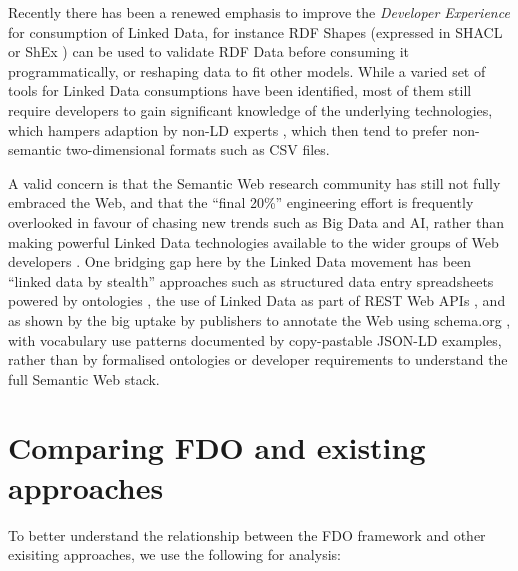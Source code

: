 \documentclass[fleqn,10pt,lineno]{wlpeerj}
\begin{document}
Recently there has been a renewed emphasis to improve the \emph{Developer Experience} \cite{BFMoe8FC} for consumption of Linked Data, for instance RDF Shapes (expressed in SHACL \cite{GDrm9dgX} or ShEx \cite{YUzogaV}) can be used to validate RDF Data \cite{ZeOAPNHa,S5BI6Mwx} before consuming it programmatically, or reshaping data to fit other models. While a varied set of tools for Linked Data consumptions have been identified, most of them still require developers to gain significant knowledge of the underlying technologies, which hampers adaption by non-LD experts \cite{o596f2JM}, which then tend to prefer non-semantic two-dimensional formats such as CSV files.

A valid concern is that the Semantic Web research community has still not fully embraced the Web, and that the ``final 20\%'' engineering effort is frequently overlooked in favour of chasing new trends such as Big Data and AI, rather than making powerful Linked Data technologies available to the wider groups of Web developers \cite{jHwttlTs}. One bridging gap here by the Linked Data movement has been ``linked data by stealth'' approaches such as structured data entry spreadsheets powered by ontologies \cite{MhsCt4P3}, the use of Linked Data as part of REST Web APIs \cite{eS6a6tlz}, and as shown by the big uptake by publishers to annotate the Web using schema.org \cite{117tX9MEG}, with vocabulary use patterns documented by copy-pastable JSON-LD examples, rather than by formalised ontologies or developer requirements to understand the full Semantic Web stack.

\hypertarget{sec:comparing}{%
\section*{Comparing FDO and existing approaches}\label{sec:comparing}}

To better understand the relationship between the FDO framework and other exisiting approaches, we use the following for analysis:
\end{document}
